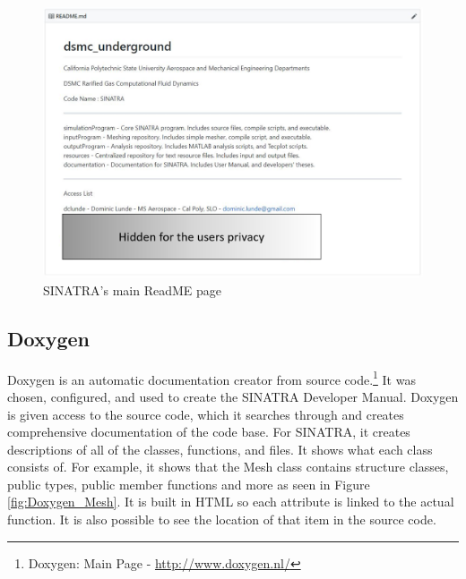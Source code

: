 \begin{figure}
\includegraphics[width=.95\textwidth]{figures/Readme_redacted.png}
\centering
\caption{SINATRA's main ReadME page}
\label{fig:readme}
\end{figure}


\subsection{Doxygen}
Doxygen is an automatic documentation creator from source code.\footnote{Doxygen:  Main Page - \url{http://www.doxygen.nl/}} It was chosen, configured, and used to create the SINATRA Developer Manual. Doxygen is given access to the source code, which it searches through and creates comprehensive documentation of the code base. For SINATRA, it creates descriptions of all of the classes, functions, and files. It shows what each class consists of. For example, it shows that the Mesh class contains structure classes, public types, public member functions and more as seen in Figure \ref{fig:Doxygen_Mesh}. It is built in HTML so each attribute is linked to the actual function. It is also possible to see the location of that item in the source code. \par


